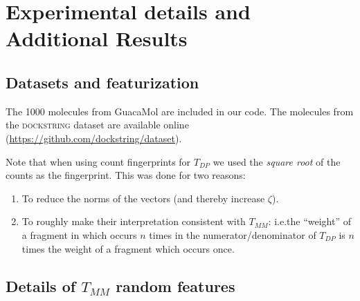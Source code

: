 \section{Experimental details and Additional Results}\label{appendix experimental details}

\subsection{Datasets and featurization}\label{apdx datasets and fingerprints}

The 1000 molecules from GuacaMol are included in our code.
The molecules from the \textsc{dockstring} dataset are available online (\url{https://github.com/dockstring/dataset}).

Note that when using count fingerprints for $T_{DP}$ we used the \emph{square root} of the counts as the fingerprint.
This was done for two reasons:
\begin{enumerate}
    \item To reduce the norms of the vectors (and thereby increase $\zeta$).
    \item To roughly make their interpretation consistent with $T_{MM}$: i.e.\@ the ``weight'' of a fragment in which occurs $n$ times in the numerator/denominator of $T_{DP}$ is $n$ times the weight of a fragment which occurs once.
\end{enumerate}

\subsection{Details of $T_{MM}$ random features}\label{apdx:explain tmm features and hash}

